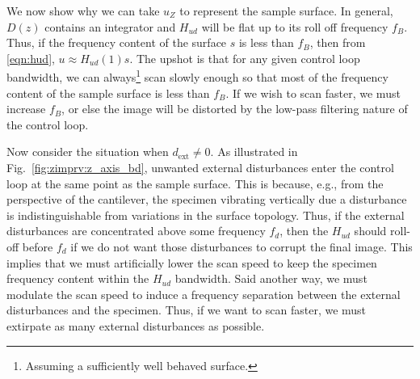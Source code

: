 We now show why we can take $u_Z$ to represent the sample surface. In general, $D(z)$ contains an integrator and $H_{ud}$ will be flat up to its roll off frequency $f_B$. Thus, if the frequency content of the surface $s$ is less than $f_B$, then from \eqref{eqn:hud}, $u \approx H_{ud}(1)s$. The upshot is that for any given control loop bandwidth, we can always\footnote{Assuming a sufficiently well behaved surface.} scan slowly enough so that most of the frequency content of the sample surface is less than $f_B$. If we wish to scan faster, we must increase $f_B$, or else the image will be distorted by the low-pass filtering nature of the control loop.

Now consider the situation when $d_{\text{ext}}\neq 0$. As illustrated in Fig.~\ref{fig:zimprv:z_axis_bd}, unwanted external disturbances enter the control loop at the same point as the sample surface.
This is because, e.g., from the perspective of the cantilever, the specimen vibrating vertically due a disturbance is indistinguishable from variations in the surface topology.
Thus, if the external disturbances are concentrated above some frequency $f_d$, then the $H_{ud}$ should roll-off before $f_d$ if we do not want those disturbances to corrupt the final image. This implies that we must artificially lower the scan speed to keep the specimen frequency content within the $H_{ud}$ bandwidth. Said another way, we must modulate the scan speed to induce a frequency separation between the external disturbances and the specimen. Thus, if we want to scan faster, we must extirpate as many external disturbances as possible.


